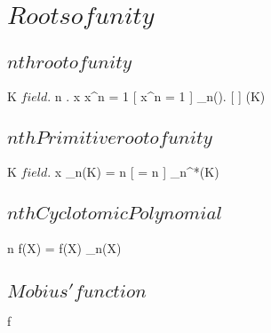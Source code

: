 \documentclass[a5paper]{book}
\begin{document}
\section{ $ Roots of unity $ }
{
	\subsection{ $ nth root of unity $ }

	{
		K $ field $.
		n \in \N.
		x \in \K
	}
	{
		x^n = 1
	}
	\denote
	{
		[ x^n = 1 ] \as \mu_n(\K).
		[  ] \as \mu(K)
	}

	\subsection{ $ nth Primitive root of unity $ }

	{
		K $ field $.
		x \in \mu_n(K)
	}
	{
		 = n
	}
	\denote
	{
		[  = n ] \as \mu_n^*(K)
	}


	\subsection{ $ nth Cyclotomic Polynomial $ }

	{
		n \in \N
	}
	{
		f(X) =  \in \C[X]
	}
	\denote
	{
		f(X) \as \Phi_n(X)
	}



	\subsection{ $ Mobius' function $ }

	{
	}
	\denote
	{
		f \as \mu
	}

	\newpage

}
\end{document}
